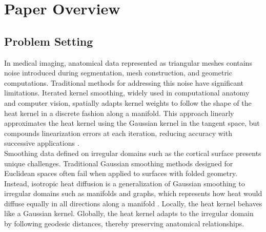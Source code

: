 \documentclass{article}
\begin{document}
\section{Paper Overview}
\subsection{Problem Setting}

In medical imaging, anatomical data represented as triangular meshes contains noise introduced during segmentation, mesh construction, and geometric computations. Traditional methods for addressing this noise have significant limitations. Iterated kernel smoothing, widely used in computational anatomy and computer vision, spatially adapts kernel weights to follow the shape of the heat kernel in a discrete fashion along a manifold. This approach linearly approximates the heat kernel using the Gaussian kernel in the tangent space, but compounds linearization errors at each iteration, reducing accuracy with successive applications \citep{seo_heat_2010}.\\

Smoothing data defined on irregular domains such as the cortical surface presents unique challenges. Traditional Gaussian smoothing methods designed for Euclidean spaces often fail when applied to surfaces with folded geometry. Instead, isotropic heat diffusion is a generalization of Gaussian smoothing to irregular domains such as manifolds and graphs, which represents how heat would diffuse equally in all directions along a manifold \citep{kushnarev_heat_2019, seo_heat_2010, zhang_graph_2008, grigoryan_heat_2012}. Locally, the heat kernel behaves like a Gaussian kernel. Globally, the heat kernel adapts to the irregular domain by following geodesic distances, thereby preserving anatomical relationships.\\
\end{document}
